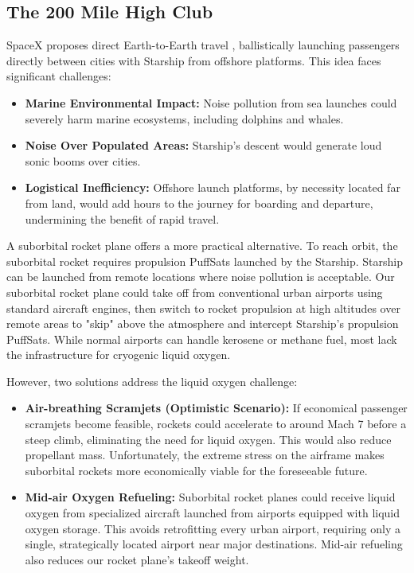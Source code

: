 \documentclass{article}
\begin{document}
{\subsection{The 200 Mile High Club} \label{sec:200_mile_high}
SpaceX proposes direct Earth-to-Earth travel \cite{earth_to_earth}, ballistically launching passengers directly between cities with Starship from offshore platforms. This idea faces significant challenges:
\begin{itemize}
\item \textbf{Marine Environmental Impact:} Noise pollution from sea launches could severely harm marine ecosystems, including dolphins and whales.
\item \textbf{Noise Over Populated Areas:} Starship's descent would generate loud sonic booms over cities.
\item \textbf{Logistical Inefficiency:} Offshore launch platforms, by necessity located far from land, would add hours to the journey for boarding and departure, undermining the benefit of rapid travel.
\end{itemize}
A suborbital rocket plane offers a more practical alternative. To reach orbit, the suborbital rocket requires propulsion PuffSats launched by the Starship.   Starship can be launched from remote locations where noise pollution is acceptable.  Our suborbital rocket plane could take off from conventional urban airports using standard aircraft engines, then switch to rocket propulsion at high altitudes over remote areas to "skip" above the atmosphere and intercept Starship's propulsion PuffSats.   While normal airports can handle kerosene or methane fuel, most lack the infrastructure for cryogenic liquid oxygen.

However, two solutions address the liquid oxygen challenge:
\begin{itemize}
\item \textbf{Air-breathing Scramjets (Optimistic Scenario):} If economical passenger scramjets become feasible, rockets could accelerate to around Mach 7 before a steep climb, eliminating the need for liquid oxygen. This would also reduce propellant mass. Unfortunately, the extreme stress on the airframe makes suborbital rockets more economically viable for the foreseeable future.
\item \textbf{Mid-air Oxygen Refueling:} Suborbital rocket planes could receive liquid oxygen from specialized aircraft launched from airports equipped with liquid oxygen storage. This avoids retrofitting every urban airport, requiring only a single, strategically located airport near major destinations.   Mid-air refueling also reduces our rocket plane's takeoff weight.
\end{itemize}

}
\end{document}
